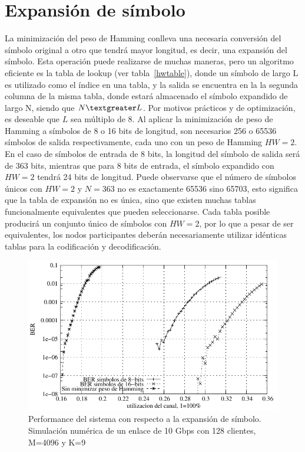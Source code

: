 \section{Expansión de símbolo}
La minimización del peso de Hamming conlleva una necesaria conversión del símbolo original a otro que tendrá mayor longitud, es decir, una expansión del símbolo.
Esta operación puede realizarse de muchas maneras, pero un algoritmo eficiente es la tabla de lookup (ver tabla~\ref{hwtable}), donde un símbolo de largo L es utilizado como el índice en una tabla, y la salida se encuentra en la la segunda columna de la misma tabla, donde estará almacenado el símbolo expandido de largo N, siendo que $N\textgreater L$.
Por motivos prácticos y de optimización, es deseable que $L$ sea múltiplo de 8. Al aplicar la minimización de peso de Hamming a símbolos de 8 o 16 bits de longitud, son necesarios 256 o 65536 símbolos de salida respectivamente, cada uno con un peso de Hamming $HW=2$. En el caso de símbolos de entrada de 8 bits, la longitud del símbolo de salida será de 363 bits, mientras que para 8 bits de entrada, el símbolo expandido con $HW=2$ tendrá 24 bits de longitud.
Puede observarse que el número de símbolos únicos con $HW=2$ y $N=363$ no es exactamente 65536 sino 65703, esto significa que la tabla de expansión no es única, sino que existen muchas tablas funcionalmente equivalentes que pueden seleccionarse. Cada tabla posible producirá un conjunto único de símbolos con $HW=2$, por lo que a pesar de ser equivalentes, los nodos participantes deberán necesariamente utilizar idénticas tablas para la codificación y decodificación.
\begin{figure}[!t]
  \centering
    \includegraphics[width=6in]{graphs/BERvsChannelES2}
    \caption{Performance del sistema con respecto a la expansión de símbolo. Simulación numérica de un enlace de 10 Gbps con 128 clientes, M=4096 y K=9}
    \label{BERvsExpansion}
\end{figure}


